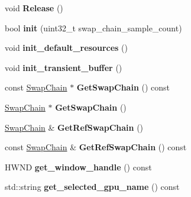 \begin{DoxyCompactItemize}
\mbox{\label{classDXRenderer_a9678630e33b952041223b960453a70d6}} 
void {\bfseries Release} ()
\item 
\mbox{\label{classDXRenderer_a3ac6805cd3b999b5a8546c36e0cb7e2c}} 
bool {\bfseries init} (uint32\+\_\+t swap\+\_\+chain\+\_\+sample\+\_\+count)
\item 
\mbox{\label{classDXRenderer_ac907448e814751eb71f3a06e8c011d23}} 
void {\bfseries init\+\_\+default\+\_\+resources} ()
\item 
\mbox{\label{classDXRenderer_a0d570933d5a913a98993ea7cd5bc657f}} 
void {\bfseries init\+\_\+transient\+\_\+buffer} ()
\item 
\mbox{\label{classDXRenderer_a17b919b6970a81fb3f1ddc62d368d0bb}} 
const \hyperlink{structSwapChain}{Swap\+Chain} $\ast$ {\bfseries Get\+Swap\+Chain} () const
\item 
\mbox{\label{classDXRenderer_a570a2b13bad1619410193226a2ae933b}} 
\hyperlink{structSwapChain}{Swap\+Chain} $\ast$ {\bfseries Get\+Swap\+Chain} ()
\item 
\mbox{\label{classDXRenderer_ab75c4ead239b0c31ff8b0b6d826d35af}} 
\hyperlink{structSwapChain}{Swap\+Chain} \& {\bfseries Get\+Ref\+Swap\+Chain} ()
\item 
\mbox{\label{classDXRenderer_a28d203f9cd99268797fbd869f996e1a8}} 
const \hyperlink{structSwapChain}{Swap\+Chain} \& {\bfseries Get\+Ref\+Swap\+Chain} () const
\item 
\mbox{\label{classDXRenderer_a42ba6c03505ed59104538abfcd554d15}} 
H\+W\+ND {\bfseries get\+\_\+window\+\_\+handle} () const
\item 
\mbox{\label{classDXRenderer_ad11199cdf6b72ffdcaff80e92e88d128}} 
std\+::string {\bfseries get\+\_\+selected\+\_\+gpu\+\_\+name} () const
\end{DoxyCompactItemize}

